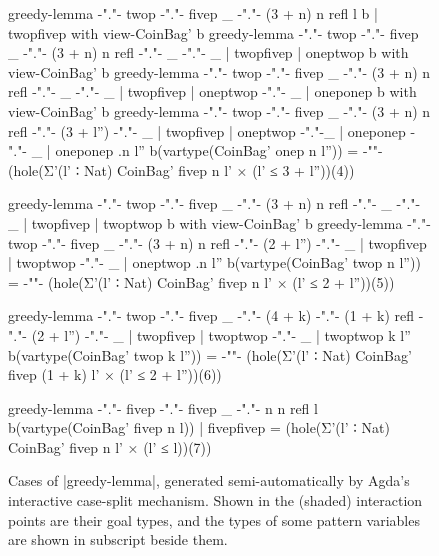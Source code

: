 \begin{figure*}
\begin{code}
greedy-lemma {-"."-}  twop   {-"."-}  fivep  _    {-"."-}  (3 + n)          n        refl           l                   b  | twopfivep  with view-CoinBag' b
greedy-lemma {-"."-}  twop   {-"."-}  fivep  _    {-"."-}  (3 + n)          n        refl  {-"."-}  _          {-"."-}  _  | twopfivep  | oneptwop          b  with view-CoinBag' b
greedy-lemma {-"."-}  twop   {-"."-}  fivep  _    {-"."-}  (3 + n)          n        refl  {-"."-}  _          {-"."-}  _  | twopfivep  | oneptwop {-"."-}  _  | oneponep        b  with view-CoinBag' b
greedy-lemma {-"."-}  twop   {-"."-}  fivep  _    {-"."-}  (3 + n)          n        refl  {-"."-}  (3 + l'')  {-"."-}  _  | twopfivep  | oneptwop {-"."-}_  | oneponep {-"."-}  _  | oneponep {.n} {l''} b(vartype(CoinBag' onep n l'')) =
{-"\hfill"-} (hole(Σ'(l' ∶ Nat) CoinBag' fivep n l' × (l' ≤ 3 + l''))(4))

greedy-lemma {-"."-}  twop   {-"."-}  fivep  _    {-"."-}  (3 + n)          n        refl  {-"."-}  _          {-"."-}  _  | twopfivep  | twoptwop          b  with view-CoinBag' b
greedy-lemma {-"."-}  twop   {-"."-}  fivep  _    {-"."-}  (3 + n)          n        refl  {-"."-}  (2 + l'')  {-"."-}  _  | twopfivep  | twoptwop {-"."-}  _  | oneptwop {.n}  {l''} b(vartype(CoinBag' twop n l'')) =
{-"\hfill"-} (hole(Σ'(l' ∶ Nat) CoinBag' fivep n l' × (l' ≤ 2 + l''))(5))

greedy-lemma {-"."-}  twop   {-"."-}  fivep  _    {-"."-}  (4 + k) {-"."-}  (1 + k)  refl  {-"."-}  (2 + l'')  {-"."-}  _  | twopfivep  | twoptwop {-"."-}  _  | twoptwop {k}   {l''} b(vartype(CoinBag' twop k l'')) =
{-"\hfill"-} (hole(Σ'(l' ∶ Nat) CoinBag' fivep (1 + k) l' × (l' ≤ 2 + l''))(6))

greedy-lemma {-"."-}  fivep  {-"."-}  fivep  _    {-"."-}  n                n        refl           l                   b(vartype(CoinBag' fivep n l))  | fivepfivep = (hole(Σ'(l' ∶ Nat) CoinBag' fivep n l' × (l' ≤ l))(7))
\end{code}
\caption{Cases of |greedy-lemma|, generated semi-automatically by Agda's interactive case-split mechanism. Shown in the (shaded) interaction points are their goal types, and the types of some pattern variables are shown in subscript beside them.}
\label{fig:greedy-lemma}
\end{figure*}

